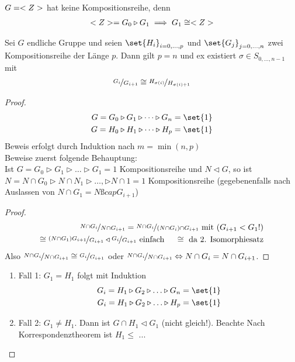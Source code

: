 \begin{*example}
	$G = <Z>$ hat keine Kompositionsreihe, denn
	\begin{align*}
		<Z> = G_0 \triangleright G_1 \implies G_1 \cong <Z>	
	\end{align*}
\end{*example}
\begin{proposition}
	Sei $G$ endliche Gruppe und seien $\set{H_i}_{i=0,\dots,p}$ und $\set{G_j}_{j=0,\dots,n}$ zwei Kompositionsreihe der Länge $p$. Dann gilt $p = n$ und ex existiert $\sigma \in S_{0,\dots, n-1}$ mit
	\begin{align*}
		\lnkset{G_i}{G_{i+1}} \cong \lnkset{H_{\sigma(i)}}{H_{\sigma(i)+1}}
	\end{align*}
\end{proposition}
\begin{proof}
	\begin{align*}
		G = G_0 \triangleright G_1 \triangleright \dots \triangleright G_n = \set{1}\\
		G = H_0 \triangleright H_1 \triangleright \dots \triangleright H_p = \set{1}
	\end{align*}
	Beweis erfolgt durch Induktion nach $m = \min(n,p)$\\
	Beweise zuerst folgende Behauptung:\\
		Ist $G = G_0 \rhd G_1 \rhd \dots \rhd G_1 = 1$ Kompositionsreihe und $N \lhd G$, so ist $N = N \cap G_0 \rhd N \cap N_1 \rhd \dots, \rhd N \cap 1 = 1$ Kompositionsreihe (gegebenenfalls nach Auslassen von $N \cap G_1 = N ßcap G_{i+1}$)
	\begin{proof}
		\begin{align*}
			\lnkset{N \cap G_i}{N \cap G_{i+1}} = \lnkset{N \cap G_i}{(N \cap G_i)\cap G_{i+1}} \mit (G_{i+1} < G_1!)\\
			\cong \lnkset{(N \cap G_1)G_{i+1}}{G_{i+1}} \lhd \lnkset{G_i}{G_{i+1}} \text{ einfach }\quad \cong\text{ da 2. Isomorphiesatz}
		\end{align*}
		Also $\lnkset{N \cap G_i}{N \cap G_{i+1}} \cong \lnkset{G_i}{G_{i+1}}$ oder $\lnkset{N \cap G_i}{N \cap G_{i+1}} \Leftrightarrow N \cap G_i = N \cap G_{i+1}$.
	\end{proof}
\begin{enumerate}
	\item Fall 1: $G_1 = H_1$ folgt mit Induktion 
	\begin{align*}
		G_i = H_1 \rhd G_2 \rhd \dots \rhd G_n = \set{1}\\
		G_i = H_1 \rhd G_2 \rhd \dots \rhd H_p = \set{1}
	\end{align*}
	\item Fall 2: $G_1 \neq H_1$. Dann ist $G \cap H_1 \lhd G_1$ (nicht gleich!). Beachte Nach Korrespondenztheorem ist $H_1 \le$ ... %
\end{enumerate}
\end{proof}